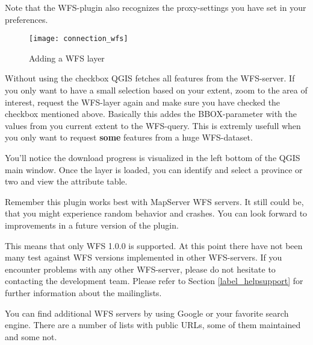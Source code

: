 Note that the WFS-plugin also recognizes the proxy-settings you have set
in your preferences.

\begin{figure}[ht]
  \centering
  	\texttt{[image: connection\_wfs]}
  	\caption{Adding a WFS layer \nixcaption}\label{fig:wfs_dmsolutions}
\end{figure}

Without using the checkbox  QGIS fetches all features from the WFS-server. If you
only want to have a small selection based on your extent, zoom to the area
of interest, request the WFS-layer again and make sure you have checked
the checkbox mentioned above. Basically this addes the BBOX-parameter with
the values from you current extent to the WFS-query. This is extremly
usefull when you only want to request \textbf{some} features from a huge
WFS-dataset.

You'll notice the download progress is visualized in the left bottom of the 
QGIS main window. Once the layer is loaded, you can identify and select a 
province or two and view the attribute table.

Remember this plugin works best with MapServer WFS servers. It still
could be, that you might experience random behavior
and crashes. You can look forward to improvements in a future version of the plugin.

This means that only WFS 1.0.0 is supported. At this point there have not
been many test against WFS versions implemented in other WFS-servers.
If you encounter problems with any other WFS-server, please do not
hesitate to contacting the development team. Please refer to Section
\ref{label_helpsupport} for further information about the mailinglists.

\begin{Tip}[htb]\caption{\textsc{Finding WFS Servers}}
You can find additional WFS servers by using Google or your
favorite search engine. There are a number of lists with public URLs, some
of them maintained and some not.
\end{Tip}

%

\FloatBarrier
